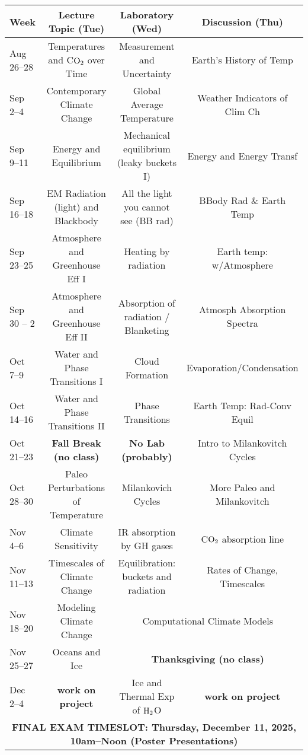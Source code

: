 \documentclass{article}
\begin{document}
\renewcommand{\arraystretch}{1.5}
\hspace{-1.7cm}%
\begin{tabular}{|l|c|c|c|}
\hline
{\bf Week}  & {\bf Lecture Topic (Tue)} & {\bf Laboratory (Wed)} &  {\bf Discussion (Thu)} \\
\hline
\hline
Aug 26--28 & Temperatures and C${\rm O}_2$ over Time & Measurement and Uncertainty & Earth's History of Temp \\
\hline
Sep 2--4 & Contemporary Climate Change & Global Average Temperature & Weather Indicators of Clim Ch \\
\hline
Sep 9--11 & Energy and Equilibrium & Mechanical equilibrium (leaky buckets I)& Energy and Energy Transf \\
\hline
Sep 16--18 & EM Radiation (light) and Blackbody & All the light you cannot see (BB rad) & BBody Rad \& Earth Temp \\
\hline
Sep 23--25  & Atmosphere and Greenhouse Eff I &  Heating by radiation & Earth temp:  w/Atmosphere \\
\hline
Sep 30 -- 2 & Atmosphere and Greenhouse Eff II & Absorption of radiation / Blanketing & Atmosph Absorption Spectra \\
\hline
Oct 7--9 & Water and Phase Transitions I &  Cloud Formation & Evaporation/Condensation \\
\hline
Oct 14--16 & Water and Phase Transitions II & Phase Transitions & Earth Temp: Rad-Conv Equil \\
\hline
Oct 21--23  & {\bf Fall Break (no class)} &  {\bf No Lab (probably)} & Intro to Milankovitch Cycles \\
\hline
Oct 28--30 & Paleo Perturbations of Temperature & Milankovich Cycles & More Paleo and Milankovitch \\
\hline
Nov 4--6 & Climate Sensitivity & IR absorption by GH gases & C${\rm O}_2$ absorption line \\
\hline
Nov 11--13 & Timescales of Climate Change & Equilibration: buckets and radiation & Rates of Change, Timescales \\
\hline
Nov 18--20  & Modeling Climate Change & \multicolumn{2}{|c|}{Computational Climate Models} \\
\hline
Nov 25--27 & Oceans and Ice & \multicolumn{2}{|c|}{\bf Thanksgiving (no class)}\\
\hline
Dec 2--4  &  {\bf work on project}  & Ice and Thermal Exp of ${\rm H}_2$O  & {\bf work on project} \\
\hline
\multicolumn{4}{|c|}{\bf FINAL EXAM TIMESLOT: Thursday, December 11, 2025, 10am--Noon (Poster Presentations)}\\
\hline
\end{tabular}


\pagestyle{empty}
\end{document}
